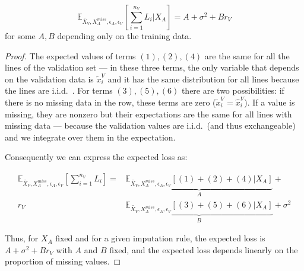 \begin{proposition}
\label{prop.linear}
$$ \mathbb{E}_{\tilde{X_V}, X_A^{miss}, \epsilon_A, \epsilon_V}[\sum\limits_{i=1}^{n_V} L_i \vert X_A] = A + \sigma^2 + Br_V$$
for some $A,B$ depending only on the training data.
\end{proposition}
\begin{proof}
The expected values of terms $(1),(2),(4)$ are the same for all the lines of the validation set --- in these three terms, the only variable that depends on the validation data is $\tilde{x}_i^V$ and it has the same distribution for all lines because the lines are i.i.d.\ . For terms $(3), (5), (6)$ there are two possibilities: if there is no missing data in the row, these terms are zero ($\tilde{x}_i^V = \hat{x}_i^V$). If a value is missing, they are nonzero but their expectations are the same for all lines with missing data --- because the validation values are i.i.d.\ (and thus exchangeable) and we integrate over them in the expectation. 

Consequently we can express the expected loss as:

\begin{align}
\label{eq.loss}
\mathbb{E}_{\tilde{X_V}, X_A^{miss}, \epsilon_A, \epsilon_V}[\sum\limits_{i=1}^{n_V} L_i] = &\underbrace{\mathbb{E}_{\tilde{X_V}, X_A^{miss}, \epsilon_A, \epsilon_V}[(1) + (2) + (4)\vert X_A]}_{A} + \\ 
r_V& \underbrace{\mathbb{E}_{\tilde{X_V}, X_A^{miss}, \epsilon_A, \epsilon_V}[(3) + (5) + (6)\vert X_A]}_{B} + \sigma^2
\end{align}

Thus, for $X_A$ fixed and for a given imputation rule, the expected loss is $A + \sigma^2 + Br_V$ with $A$ and $B$ fixed, and the expected loss depends linearly on the proportion of missing values. 
\end{proof}


